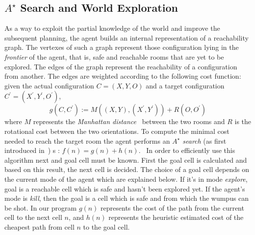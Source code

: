 \documentclass{llncs}
\begin{document}

\subsection{$A^{\star}$ Search and World Exploration}

As a way to exploit the partial knowledge of the world and improve the subsequent planning, the agent builds an internal representation of a reachability graph.
The vertexes of such a graph represent those configuration lying in the \emph{frontier} of the agent, that is, safe and reachable rooms that are yet to be explored.
The edges of the graph represent the reachability of a configuration from another.
The edges are weighted according to the following cost function: given the actual configuration $C = (X,Y,O)$ and a target configuration $C^\prime = (X^\prime,Y^\prime,O^\prime)$,
$$
	g(C,C^\prime) := M((X,Y),(X^\prime,Y^\prime)) + R(O,O^\prime)
$$
where $M$ represents the \emph{Manhattan distance}~\cite{Manhattan} between the two rooms and $R$ is the rotational cost between the two orientations.
To compute the minimal cost needed to reach the target room the agent performs an \emph{$A^{\star}$ search} (as first introduced in~\cite{AStar}) s : \(f(n) = g(n) + h(n)\). \
In order to efficiently use this algorithm next and goal cell must be known. 
First the goal cell is calculated and based on this result, the next cell is decided.  The choice of a goal cell depends on the current mode of the agent which are explained below. If it's in mode \emph{explore}, goal is a reachable cell which is safe and hasn't been explored yet. If the agent's mode is \emph{kill}, then the goal is a cell which is safe and from which the wumpus can be shot.   
In our program \(g(n)\) represents the cost of the path from the current cell to the next cell \(n\), and \(h(n)\) represents the heuristic estimated cost of the cheapest path from cell \(n\) to the goal cell. 
\end{document}

